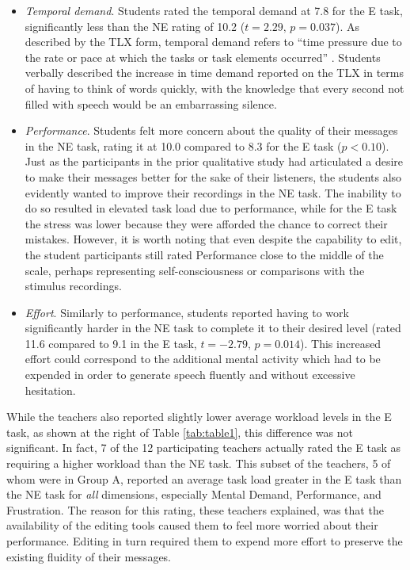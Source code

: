 \begin{itemize}
	\item \emph{Temporal demand}. Students rated the temporal demand at 7.8 for the E task, significantly less than the NE rating of 10.2 ($t=2.29,\,p=0.037$). 
	As described by the TLX form, temporal demand refers to ``time pressure due to the rate or pace at which the tasks or task elements occurred'' \cite{nasatlx}.
	Students verbally described the increase in time demand reported on the TLX in terms of having to think of words quickly, with the knowledge that every second not filled with speech would be an embarrassing silence.
	\item \emph{Performance}. Students felt more concern about the quality of their messages in the NE task, rating it at 10.0 compared to 8.3 for the E task ($p<0.10$). 
	Just as the participants in the prior qualitative study had articulated a desire to make their messages better for the sake of their listeners, the students also evidently wanted to improve their recordings in the NE task. 
	The inability to do so resulted in elevated task load due to performance, while for the E task the stress was lower because they were afforded the chance to correct their mistakes.
	However, it is worth noting that even despite the capability to edit, the student participants still rated Performance close to the middle of the scale, perhaps representing self-consciousness or comparisons with the stimulus recordings.
	\item \emph{Effort}. Similarly to performance, students reported having to work significantly harder in the NE task to complete it to their desired level (rated 11.6 compared to 9.1 in the E task, $t=-2.79,\,p=0.014$). 
	This increased effort could correspond to the additional mental activity which had to be expended in order to generate speech fluently and without excessive hesitation.
\end{itemize}

While the teachers also reported slightly lower average workload levels in the E task, as shown at the right of Table \ref{tab:table1}, this difference was not significant.
In fact, 7 of the 12 participating teachers actually rated the E task as requiring a higher workload than the NE task.
This subset of the teachers, 5 of whom were in Group A, reported an average task load greater in the E task than the NE task for \emph{all} dimensions, especially Mental Demand, Performance, and Frustration.
The reason for this rating, these teachers explained, was that the availability of the editing tools caused them to feel more worried about their performance.
Editing in turn required them to expend more effort to preserve the existing fluidity of their messages.

